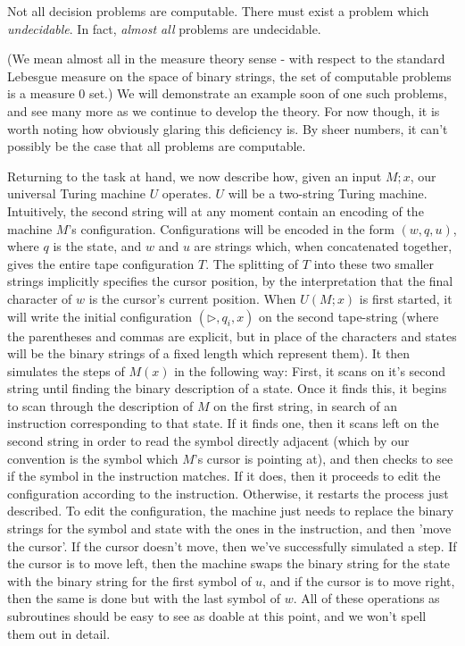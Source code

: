 \begin{fact}
	Not all decision problems are computable. There must exist a problem which \textit{undecidable}. In fact, \textit{almost all} problems are undecidable. 
\end{fact}
(We mean almost all in the measure theory sense - with respect to the standard Lebesgue measure on the space of binary strings, the set of computable problems is a measure $0$ set.) We will demonstrate an example soon of one such problems, and see many more as we continue to develop the theory. For now though, it is worth noting how obviously glaring this deficiency is. By sheer numbers, it can't possibly be the case that all problems are computable. 

Returning to the task at hand, we now describe how, given an input $M;x$, our universal Turing machine $U$ operates. $U$ will be a two-string Turing machine. Intuitively, the second string will at any moment contain an encoding of the machine $M$'s configuration. Configurations will be encoded in the form $(w,q,u)$, where $q$ is the state, and $w$ and $u$ are strings which, when concatenated together, gives the entire tape configuration $T$. The splitting of $T$ into these two smaller strings implicitly specifies the cursor position, by the interpretation that the final character of $w$ is the cursor's current position. When $U(M;x)$ is first started, it will write the initial configuration $(\triangleright,q_i,x)$ on the second tape-string (where the parentheses and commas are explicit, but in place of the characters and states will be the binary strings of a fixed length which represent them). It then simulates the steps of $M(x)$ in the following way: First, it scans on it's second string until finding the binary description of a state. Once it finds this, it begins to scan through the description of $M$ on the first string, in search of an instruction corresponding to that state. If it finds one, then it scans left on the second string in order to read the symbol directly adjacent (which by our convention is the symbol which $M$'s cursor is pointing at), and then checks to see if the symbol in the instruction matches. If it does, then it proceeds to edit the configuration according to the instruction. Otherwise, it restarts the process just described. To edit the configuration, the machine just needs to replace the binary strings for the symbol and state with the ones in the instruction, and then 'move the cursor'. If the cursor doesn't move, then we've successfully simulated a step. If the cursor is to move left, then the machine swaps the binary string for the state with the binary string for the first symbol of $u$, and if the cursor is to move right, then the same is done but with the last symbol of $w$. All of these operations as subroutines should be easy to see as doable at this point, and we won't spell them out in detail. 

